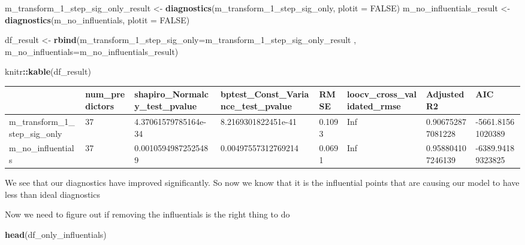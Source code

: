 \documentclass[
]{article}
\newenvironment{Shaded}{\begin{snugshade}}{\end{snugshade}}
\newcommand{\DataTypeTok}[1]{\textcolor[rgb]{0.13,0.29,0.53}{#1}}
\newcommand{\DecValTok}[1]{\textcolor[rgb]{0.00,0.00,0.81}{#1}}
\newcommand{\KeywordTok}[1]{\textcolor[rgb]{0.13,0.29,0.53}{\textbf{#1}}}
\newcommand{\NormalTok}[1]{#1}
\newcommand{\OperatorTok}[1]{\textcolor[rgb]{0.81,0.36,0.00}{\textbf{#1}}}
\newcommand{\OtherTok}[1]{\textcolor[rgb]{0.56,0.35,0.01}{#1}}
\newcommand{\StringTok}[1]{\textcolor[rgb]{0.31,0.60,0.02}{#1}}
\begin{document}
\begin{Shaded}
\begin{Highlighting}[]
\NormalTok{m_transform_}\DecValTok{1}\NormalTok{_step_sig_only_result <-}\StringTok{ }\KeywordTok{diagnostics}\NormalTok{(m_transform_}\DecValTok{1}\NormalTok{_step_sig_only, }\DataTypeTok{plotit =} \OtherTok{FALSE}\NormalTok{)}
\NormalTok{m_no_influentials_result <-}\StringTok{ }\KeywordTok{diagnostics}\NormalTok{(m_no_influentials, }\DataTypeTok{plotit =} \OtherTok{FALSE}\NormalTok{)}

\NormalTok{df_result <-}\StringTok{ }\KeywordTok{rbind}\NormalTok{(}\DataTypeTok{m_transform_1_step_sig_only=}\NormalTok{m_transform_}\DecValTok{1}\NormalTok{_step_sig_only_result , }\DataTypeTok{m_no_influentials=}\NormalTok{m_no_influentials_result)}

\NormalTok{knitr}\OperatorTok{::}\KeywordTok{kable}\NormalTok{(df_result)}
\end{Highlighting}
\end{Shaded}

\begin{tabular}{l|l|l|l|l|l|l|l}
\hline
  & num\_predictors & shapiro\_Normalcy\_test\_pvalue & bptest\_Const\_Variance\_test\_pvalue & RMSE & loocv\_cross\_validated\_rmse & AdjustedR2 & AIC\\
\hline
m\_transform\_1\_step\_sig\_only & 37 & 4.37061579785164e-34 & 8.2169301822451e-41 & 0.1093 & Inf & 0.906752877081228 & -5661.81561020389\\
\hline
m\_no\_influentials & 37 & 0.00105949872525489 & 0.00497557312769214 & 0.0691 & Inf & 0.958804107246139 & -6389.94189323825\\
\hline
\end{tabular}

We see that our diagnostics have improved significantly. So now we know that it is the influential points that are causing our model to have less than ideal diagnostics

Now we need to figure out if removing the influentials is the right thing to do

\begin{Shaded}
\begin{Highlighting}[]
\KeywordTok{head}\NormalTok{(df_only_influentials)}
\end{Highlighting}
\end{Shaded}
\end{document}
